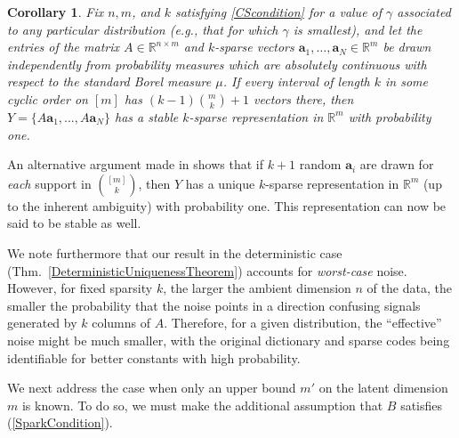 \documentclass[journal, twocolumn]{IEEEtran}
\newtheorem{corollary}{Corollary}
\begin{document}
\begin{corollary}\label{ProbabilisticCor}
Fix $n, m$, and $k$ satisfying \eqref{CScondition} for a value of $\gamma$ associated to any particular distribution (e.g., that for which $\gamma$ is smallest), and let the entries of the matrix $A \in \mathbb{R}^{n \times m}$ and $k$-sparse vectors $\mathbf{a}_1, \ldots, \mathbf{a}_N \in \mathbb{R}^m$ be drawn independently from probability measures which are absolutely continuous with respect to the standard Borel measure $\mu$. If every interval of length $k$ in some cyclic order on $[m]$ has $(k-1){m \choose k} + 1$ vectors there, then $Y = \{A\mathbf{a}_1, \ldots, A\mathbf{a}_N\}$ has a stable $k$-sparse representation in $\mathbb{R}^m$ with probability one.
\end{corollary}

An alternative argument made in \cite{Hillar15} shows that if $k+1$ random $\mathbf{a}_i$ are drawn for \emph{each} support in ${[m] \choose k}$, then $Y$ has a unique $k$-sparse representation in $\mathbb{R}^m$ (up to the inherent ambiguity) with probability one. This representation can now be said to be stable as well. %

We note furthermore that our result in the deterministic case (Thm.~\ref{DeterministicUniquenessTheorem}) accounts for \emph{worst-case} noise.  However, for fixed sparsity $k$, the larger the ambient dimension $n$ of the data, the smaller the probability that the noise points in a direction  confusing signals generated by $k$ columns of $A$.  Therefore, for a given distribution, the ``effective'' noise might be much smaller, with the original dictionary and sparse codes being identifiable for better constants with high probability. 

We next address the case when only an upper bound $m'$ on the latent dimension $m$ is known. To do so, we must make the additional assumption that $B$ satisfies (\ref{SparkCondition}). 
\end{document}
